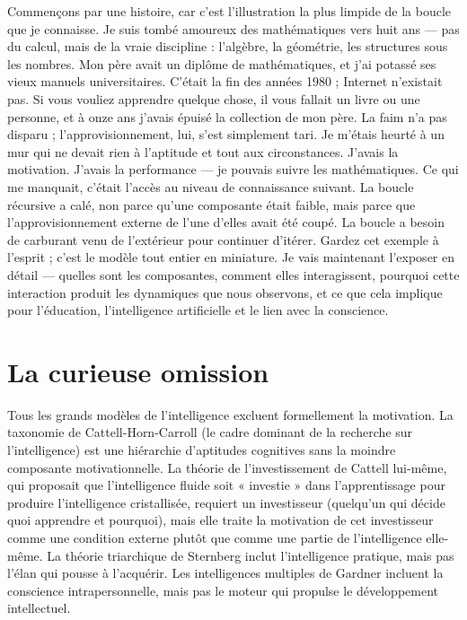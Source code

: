 \documentclass[11pt, twoside, openright]{book}
\begin{document}
Commençons par une histoire, car c'est l'illustration la plus limpide de la boucle que je connaisse. Je suis tombé amoureux des mathématiques vers huit ans --- pas du calcul, mais de la vraie discipline : l'algèbre, la géométrie, les structures sous les nombres. Mon père avait un diplôme de mathématiques, et j'ai potassé ses vieux manuels universitaires. C'était la fin des années 1980 ; Internet n'existait pas. Si vous vouliez apprendre quelque chose, il vous fallait un livre ou une personne, et à onze ans j'avais épuisé la collection de mon père. La faim n'a pas disparu ; l'approvisionnement, lui, s'est simplement tari. Je m'étais heurté à un mur qui ne devait rien à l'aptitude et tout aux circonstances. J'avais la motivation. J'avais la performance --- je pouvais suivre les mathématiques. Ce qui me manquait, c'était l'accès au niveau de connaissance suivant. La boucle récursive a calé, non parce qu'une composante était faible, mais parce que l'approvisionnement externe de l'une d'elles avait été coupé. La boucle a besoin de carburant venu de l'extérieur pour continuer d'itérer. Gardez cet exemple à l'esprit ; c'est le modèle tout entier en miniature. Je vais maintenant l'exposer en détail --- quelles sont les composantes, comment elles interagissent, pourquoi cette interaction produit les dynamiques que nous observons, et ce que cela implique pour l'éducation, l'intelligence artificielle et le lien avec la conscience.

\section*{La curieuse omission}

Tous les grands modèles de l'intelligence excluent formellement la motivation. La taxonomie de Cattell-Horn-Carroll (le cadre dominant de la recherche sur l'intelligence) est une hiérarchie d'aptitudes cognitives sans la moindre composante motivationnelle. La théorie de l'investissement de Cattell lui-même, qui proposait que l'intelligence fluide soit « investie » dans l'apprentissage pour produire l'intelligence cristallisée, requiert un investisseur (quelqu'un qui décide quoi apprendre et pourquoi), mais elle traite la motivation de cet investisseur comme une condition externe plutôt que comme une partie de l'intelligence elle-même. La théorie triarchique de Sternberg inclut l'intelligence pratique, mais pas l'élan qui pousse à l'acquérir. Les intelligences multiples de Gardner incluent la conscience intrapersonnelle, mais pas le moteur qui propulse le développement intellectuel.
\end{document}
